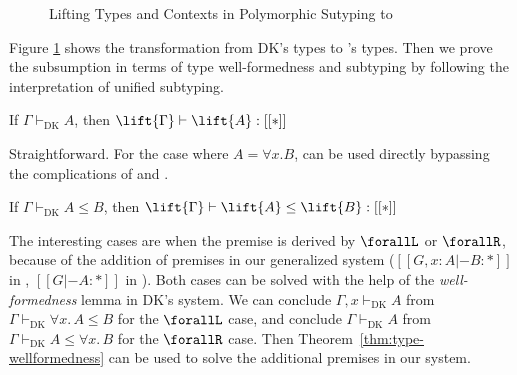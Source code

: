 \begin{figure}
    \caption{Lifting Types and Contexts in Polymorphic Sutyping to \name}
    \label{fig:lift}
\end{figure}
Figure \ref{fig:lift} shows the transformation from
DK's
types to \name's types.
Then we prove the subsumption in terms of type well-formedness and subtyping
by following the interpretation of unified subtyping.

\begin{theorem}
\label{thm:type-wellformedness}
    If $\Gamma \vdash_{\text{DK}} A$, then $\lift{\Gamma} \vdash \lift{A} : [[*]]$
\end{theorem}

Straightforward. For the case where $A = \forall x. B$,  can be
used directly bypassing the complications of  and
.

\begin{theorem}
    If $\Gamma \vdash_{\text{DK}} A \le B$, then $\lift{\Gamma} \vdash \lift{A} \le \lift{B} : [[*]]$
\end{theorem}

The interesting cases are when the premise is derived by $\forallL$ or $\forallR$,
because of the addition of premises in our generalized system
($[[G, x : A |- B : *]]$ in , $[[G |- A : *]]$ in ).
Both cases can be solved with the help of the \emph{well-formedness} lemma in
DK's system. We can conclude $\Gamma, x \vdash_{\text{DK}} A$ from
$\Gamma \vdash_{\text{DK}} \forall x.\, A \le B$ for the $\forallL$ case,
and conclude $\Gamma \vdash_{\text{DK}} A$ from $\Gamma \vdash_{\text{DK}} A \le \forall x.\, B$ for the $\forallR$ case.
Then Theorem~\ref{thm:type-wellformedness} can be used to solve the additional
premises in our system.

